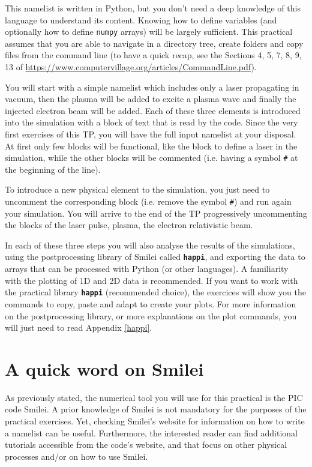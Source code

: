 \documentclass[a4paper,12pt]{extarticle}
\newcommand{\smilei}{{\sc Smilei}\xspace}
\newcommand{\commandline}[1]{\texttt{\textbf{#1}}}
\begin{document}
This namelist is written in Python, but you don't need a deep knowledge of this language to understand its content. Knowing how to define variables (and optionally how to define \texttt{numpy} arrays) will be largely sufficient. This practical assumes that you are able to navigate in a directory tree, create folders and copy files from the command line (to have a quick recap, see the Sections 4, 5, 7, 8, 9, 13 of \url{https://www.computervillage.org/articles/CommandLine.pdf}). 

You will start with a simple namelist which includes only a laser propagating in vacuum, then the plasma will be added to excite a plasma wave and finally the injected electron beam will be added. Each of these three elements is introduced into the simulation with a block of text that is read by the code. Since the very first exercises of this TP, you will have the full input namelist at your disposal. At first only few blocks will be functional, like the block to define a laser in the simulation, while the other blocks will be commented (i.e. having a symbol \texttt{\#} at the beginning of the line).

To introduce a new physical element to the simulation, you just need to uncomment the corresponding block (i.e. remove the symbol \texttt{\#}) and run  again your simulation. You will arrive to the end of the TP progressively uncommenting the blocks of the laser pulse, plasma, the electron relativistic beam.

In each of these three steps you will also analyse the results of the simulations, using the postprocessing library of \smilei called \commandline{happi}, and exporting the data to arrays that can be processed with Python (or other languages).  A familiarity with the plotting of 1D and 2D data is recommended. If you want to work with the practical library \commandline{happi} (recommended choice),  the exercices will show you the commands to copy, paste and adapt to create your plots. For more information on the postprocessing library, or more explanations on the plot commands, you will just need to read Appendix \ref{happi}.

\section*{A quick word on \smilei} %

As previously stated, the numerical tool you will use for this practical is the PIC code \smilei. A prior knowledge of \smilei is not mandatory for the purposes of the practical exercises.
Yet, checking \smilei's website for information on how to write a namelist can be useful. 
Furthermore, the interested reader can find additional tutorials accessible from the code's website, and that focus on other physical processes and/or on how to use \smilei.
\end{document}
